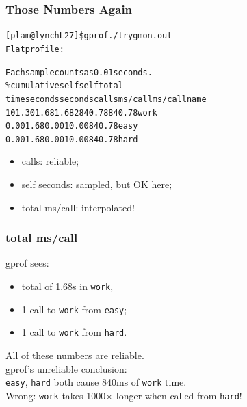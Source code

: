 \documentclass[aspectratio=43]{beamer}
\newenvironment{changemargin}[1]{%
  \begin{list}{}{%
    \setlength{\topsep}{0pt}%
    \setlength{\leftmargin}{#1}%
    \setlength{\rightmargin}{1em}
    \setlength{\listparindent}{\parindent}%
    \setlength{\itemindent}{\parindent}%
    \setlength{\parsep}{\parskip}%
  }%
  \item[]}{\end{list}}
\begin{document}
\begin{frame}[fragile]
  \frametitle{Those Numbers Again}

\begin{alltt}
[plam@lynch L27]\$ gprof ./try gmon.out
Flat profile:

Each sample counts as 0.01 seconds.
  \%   cumulative   self              self     total           
 time   seconds   seconds    calls  ms/call  ms/call  name    
101.30      1.68     1.68        2   840.78   840.78  work
  0.00      1.68     0.00        1     0.00   \alert{840.78}  easy
  0.00      1.68     0.00        1     0.00   \alert{840.78}  hard
\end{alltt}

\begin{changemargin}{2cm}
  \begin{itemize}
  \item calls: reliable;
  \item self seconds: sampled, but OK here;
    \item total ms/call: interpolated!
  \end{itemize}
\end{changemargin}
\end{frame}

\begin{frame}
  \frametitle{total ms/call}
\begin{changemargin}{2cm}
  gprof sees:
  \begin{itemize}
    \item total of 1.68s in {\tt work},\\
    \item 1 call to {\tt work} from {\tt easy};
    \item 1 call to {\tt work} from {\tt hard}.
  \end{itemize}
  All of these numbers are reliable.\\[1em]
  gprof's unreliable conclusion: \\ {\tt easy}, {\tt hard} 
  both cause 840ms of {\tt work} time.\\[1em]
  
  \alert{Wrong}: {\tt work} takes 1000$\times$ longer when called from {\tt hard}!
\end{changemargin}
\end{frame}
\end{document}
